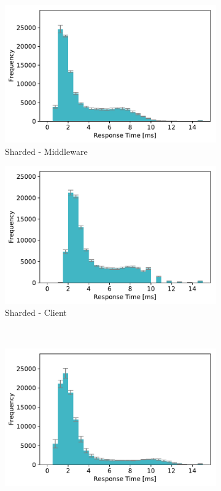 \documentclass[11pt,a4paper]{article}
\begin{document}
\begin{figure}
	\begin{subfigure}[b]{.49\linewidth}
		\centering
		\includegraphics[width=\linewidth]{data/exp51_sharded_mget6_hist_mw.pdf}
		\caption{Sharded - Middleware}\label{fig1a}
	\end{subfigure}\hfill
	\begin{subfigure}[b]{.49\linewidth}
		\centering
		\includegraphics[width=\linewidth]{data/exp51_sharded_mget6_hist_client.pdf}
		\caption{Sharded - Client}\label{fig1b}
	\end{subfigure} \\
	\begin{subfigure}[b]{.49\linewidth}
		\centering
		\includegraphics[width=\linewidth]{data/exp52_nonsharded_mget6_hist_mw.pdf}

\end{subfigure}
\end{figure}
\end{document}
